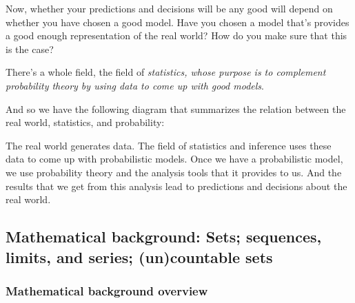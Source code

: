 \documentclass[pdftex, brazil, 12pt, twoside]{article}
\begin{document}
Now, whether your predictions and decisions will be any good
will depend on whether you have chosen a good model.
Have you chosen a model that's provides a good enough
representation of the real world?
How do you make sure that this is the case?

There's a whole field, the field of \emph{statistics, whose
purpose is to complement probability theory by using
data to come up with good models}.

And so we have the following diagram that summarizes the
relation between the real world, statistics, and
probability:

\begin{figure}[H]
  \begin{center}
  \end{center}
\end{figure}

The real world generates data.
The field of statistics and inference uses these data to
come up with probabilistic models.
Once we have a probabilistic model, we use probability
theory and the analysis tools that it provides to us.
And the results that we get from this analysis lead to
predictions and decisions about the real world.


\subsection{Mathematical background: Sets; sequences, limits, and series;
  (un)countable sets}
\label{un1-math-back}

\subsubsection{Mathematical background overview}
\label{un1-math-back-ovw}
\end{document}
